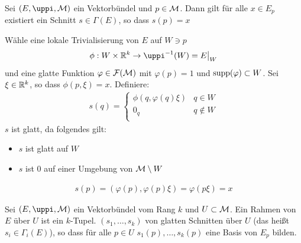 \begin{lem}
Sei $(E, \pi, \mfk)$ ein Vektorbündel und $p \in \mathcal{M}$.
Dann gilt für alle $x \in E_p$ existiert ein Schnitt $s \in \Gamma (E)$, so dass $s(p)=x$
\end{lem}
\begin{bew}
Wähle eine lokale Trivialisierung von $E$ auf $W \ni p$
\begin{align}
\phi: W \times \R^k \to \pi^{-1}(W) = E\big\vert_W
\end{align}
und eine glatte Funktion $\varphi \in \mathcal{F}(\mathcal{M})$ mit $\varphi(p)=1$ und $\operatorname{supp}(\varphi) \subset W$.
Sei $\xi \in \mathbb{R}^k$, so dass $\phi (p, \xi)=x$.
Definiere:
\begin{align}
s(q) = \left\{
\begin{array}{ll}
\phi(q, \varphi(q)\xi) & q\in W \\
0_q & q \not\in W \\
\end{array}
\right.
\end{align}
$s$ ist glatt, da folgendes gilt:
\begin{itemize}
\item $s$ ist glatt auf $W$
\item $s$ ist $0$ auf einer Umgebung von $\mathcal{M} \setminus W$
\end{itemize}
\begin{align}
s(p) = ( \varphi(p), \varphi(p) \xi ) = \varphi (p \xi) = x
\end{align}
\end{bew}

\begin{defs}
Sei $(E, \pi, \mfk)$ ein Vektorbündel vom Rang $k$ und $U \subset \mathcal{M}$.
Ein Rahmen von $E$ über $U$ ist ein $k$-Tupel.
$(s_1, \dots, s_k)$ von glatten Schnitten über $U$ (das heißt $s_i \in \Gamma_i (E)$), so dass für alle $p \in U$
$s_1 (p), \dots, s_k (p)$ eine Basis von $E_p$ bilden.
\end{defs}